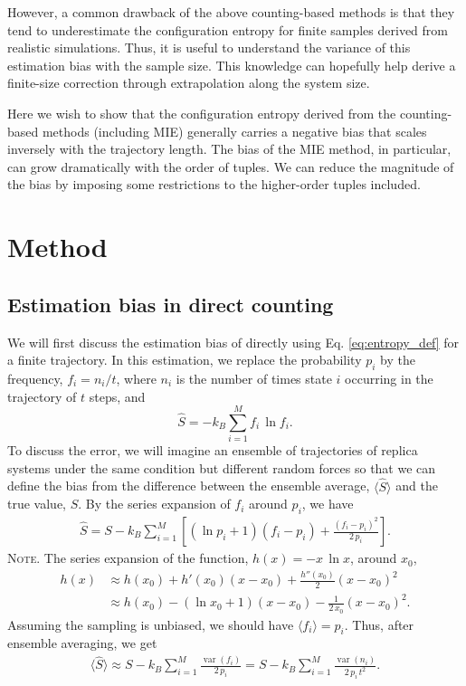 \documentclass[reprint, superscriptaddress]{revtex4-1}
\newcommand{\note}[1]{{\color{DarkGreen}\footnotesize \textsc{Note.} #1}}
\begin{document}
However, a common drawback of the above counting-based methods is that
they tend to underestimate the configuration entropy for finite samples
derived from realistic simulations.
%
Thus, it is useful to understand the variance of this estimation bias with the sample size.
%
This knowledge can hopefully help derive a finite-size correction
through extrapolation along the system size.

Here we wish to show that the configuration entropy derived
from the counting-based methods (including MIE)
generally carries a negative bias that scales inversely with the trajectory length.
%
The bias of the MIE method, in particular,
can grow dramatically with the order of tuples.
%
We can reduce the magnitude of the bias
by imposing some restrictions to the higher-order tuples included.

\section{Method}

\subsection{Estimation bias in direct counting}

We will first discuss the estimation bias
of directly using Eq. \eqref{eq:entropy_def} for a finite trajectory.
%
In this estimation, we replace the probability $p_i$
by the frequency, $f_i = n_i / t$,
where $n_i$ is the number of times state $i$ occurring in the trajectory of $t$ steps,
and
%
\begin{equation}
  \hat S
  =
  -k_B \sum_{i = 1}^M f_i \, \ln f_i
  .
  \label{eq:entropy_est}
\end{equation}
%
To discuss the error,
we will imagine an ensemble of trajectories of replica systems
under the same condition but different random forces
so that we can define the bias from the difference
between the ensemble average, $\langle \hat S \rangle$
and the true value, $S$.
%
By the series expansion of $f_i$ around $p_i$, we have
%
\begin{align*}
  \hat S
  =
  S - k_B \sum_{i = 1}^M \left[
    (\ln p_i + 1) (f_i - p_i)
    + \frac{ (f_i - p_i)^2 } { 2 \, p_i }
  \right]
  .
\end{align*}
%
\note{The series expansion of the function, $h(x) = -x \, \ln x$,
around $x_0$,
%
\begin{align*}
  h(x)
  &\approx h(x_0) + h'(x_0) (x - x_0) + \frac{h''(x_0)}{2} (x - x_0)^2 \\
  &\approx h(x_0) - (\ln x_0 + 1) ( x - x_0) - \frac{1}{2 \, x_0} (x - x_0)^2
  .
\end{align*}
}
%
Assuming the sampling is unbiased,
we should have $\langle f_i \rangle = p_i$.
%
Thus, after ensemble averaging, we get
%
\begin{align*}
  \langle \hat S \rangle
  \approx
  S - k_B \sum_{i = 1}^M
    \frac{ \operatorname{var} (f_i) } { 2 \, p_i }
  =
  S - k_B \sum_{i = 1}^M
    \frac{ \operatorname{var} (n_i) } { 2 \, p_i \, t^2 }
  .
\end{align*}
\end{document}
